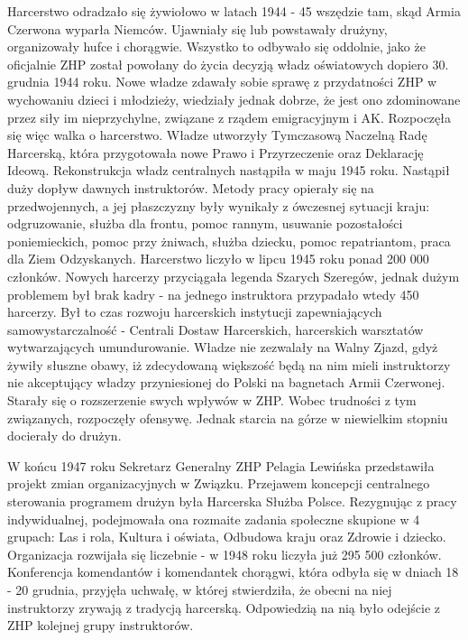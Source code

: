 Harcerstwo odradzało się żywiołowo w latach 1944 - 45 wszędzie tam, skąd Armia Czerwona wyparła Niemców. Ujawniały się lub powstawały drużyny, organizowały hufce i chorągwie. Wszystko to odbywało się oddolnie, jako że oficjalnie ZHP został powołany do życia decyzją władz oświatowych dopiero 30. grudnia 1944 roku. Nowe władze zdawały sobie sprawę z przydatności ZHP w wychowaniu dzieci i młodzieży, wiedziały jednak dobrze, że jest ono zdominowane przez siły im nieprzychylne, związane z rządem emigracyjnym i AK. Rozpoczęła się więc walka o harcerstwo. Władze utworzyły Tymczasową Naczelną Radę Harcerską, która przygotowała nowe Prawo i Przyrzeczenie oraz Deklarację Ideową. Rekonstrukcja władz centralnych nastąpiła w maju 1945 roku. Nastąpił duży dopływ dawnych instruktorów. Metody pracy opierały się na przedwojennych, a jej płaszczyzny były wynikały z ówczesnej sytuacji kraju: odgruzowanie, służba dla frontu, pomoc rannym, usuwanie pozostałości poniemieckich, pomoc przy żniwach, służba dziecku, pomoc repatriantom, praca dla Ziem Odzyskanych. Harcerstwo liczyło w lipcu 1945 roku ponad 200 000 członków. Nowych harcerzy przyciągała legenda Szarych Szeregów, jednak dużym problemem był brak kadry - na jednego instruktora przypadało wtedy 450 harcerzy. Był to czas rozwoju harcerskich instytucji zapewniających samowystarczalność - Centrali Dostaw Harcerskich, harcerskich warsztatów wytwarzających umundurowanie. Władze nie zezwalały na Walny Zjazd, gdyż żywiły słuszne obawy, iż zdecydowaną większość będą na nim mieli instruktorzy nie akceptujący władzy przyniesionej do Polski na bagnetach Armii Czerwonej. Starały się o rozszerzenie swych wpływów w ZHP. Wobec trudności z tym związanych, rozpoczęły ofensywę. Jednak starcia na górze w niewielkim stopniu docierały do drużyn.

W końcu 1947 roku Sekretarz Generalny ZHP Pelagia Lewińska przedstawiła projekt zmian organizacyjnych w Związku. Przejawem koncepcji centralnego sterowania programem drużyn była Harcerska Służba Polsce. Rezygnując z pracy indywidualnej, podejmowała ona rozmaite zadania społeczne skupione w 4 grupach: Las i rola, Kultura i oświata, Odbudowa kraju oraz Zdrowie i dziecko. Organizacja rozwijała się liczebnie - w 1948 roku liczyła już 295 500 członków. Konferencja komendantów i komendantek chorągwi, która odbyła się w dniach 18 - 20 grudnia, przyjęła uchwałę, w której stwierdziła, że obecni na niej instruktorzy zrywają z tradycją harcerską. Odpowiedzią na nią było odejście z ZHP kolejnej grupy instruktorów.

